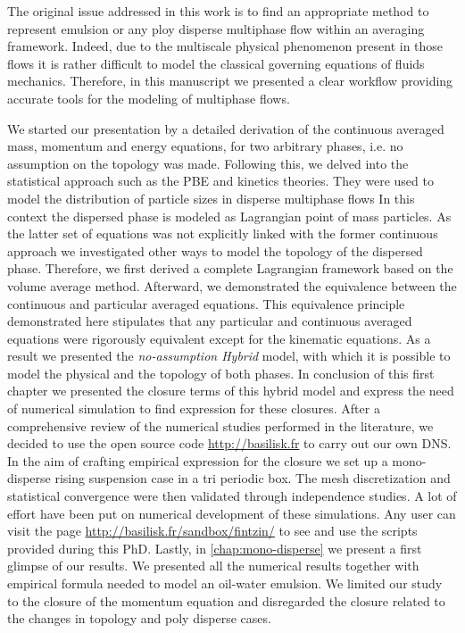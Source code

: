 
The original issue addressed in this work is to find an appropriate method to represent emulsion or any ploy disperse multiphase flow within an averaging framework.
Indeed, due to the multiscale physical phenomenon present in those flows it is rather difficult to model the classical governing equations of fluids mechanics.  
Therefore, in this manuscript we presented a clear workflow providing accurate tools for the modeling of multiphase flows. 

We started our presentation by a detailed derivation of the continuous averaged mass, momentum and energy equations, for two arbitrary phases, i.e. no assumption on the topology was made.
Following this, we delved into the statistical approach such as the PBE and kinetics theories.
They were used to model the distribution of particle sizes in disperse multiphase flows
In this context the dispersed phase is modeled as Lagrangian point of mass particles. 
As the latter set of equations was not explicitly linked with the former continuous approach we investigated other ways to model the topology of the dispersed phase. 
Therefore, we first derived a complete Lagrangian framework based on the volume average method. 
Afterward, we demonstrated the equivalence between the continuous and particular averaged equations.
This equivalence principle demonstrated here stipulates that any particular and continuous averaged equations were rigorously equivalent except for the kinematic equations. 
As a result we presented the \textit{no-assumption Hybrid} model, with which it is possible to model the physical and the topology of both phases. 
In conclusion of this first chapter we presented the closure terms of this hybrid model and express the need of numerical simulation to find expression for these closures. 
After a comprehensive review of the numerical studies performed in the literature, we decided to use the open source code \url{http://basilisk.fr} to carry out our own DNS.
In the aim of crafting empirical expression for the closure we set up a mono-disperse rising suspension case in a tri periodic box.
The mesh discretization and statistical convergence were then validated through independence studies. 
A lot of effort have been put on numerical development of these simulations. 
Any user can visit the page \url{http://basilisk.fr/sandbox/fintzin/} to see and use the scripts provided during this PhD. 
Lastly, in \ref{chap:mono-disperse} we present a first glimpse of our results.
We presented all the numerical results together with empirical formula needed to model an oil-water emulsion. 
We limited our study to the closure of the momentum  equation and disregarded the closure related to the changes in topology and poly disperse cases. 

